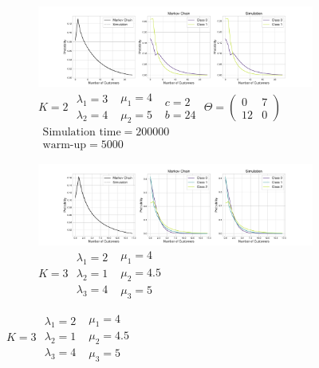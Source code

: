 \documentclass{article}
\begin{document}
\begin{figure}[h!]
  \begin{center}
  \begin{subfigure}[b]{\textwidth}
    \includegraphics[width=\textwidth]{img/appendix_2class.pdf}
    \caption{
        $K = 2$
        $\begin{array}{c}\lambda_1 = 3\\\lambda_2 = 4\end{array}$
        $\begin{array}{c}\mu_1 = 4\\\mu_2 = 5\end{array}$
        $\begin{array}{c}c=2\\b=24\end{array}$
        $\Theta = \begin{pmatrix}0 & 7\\12 & 0\end{pmatrix}$
        $\begin{array}{c}\text{Simulation time} = 200000\\\text{warm-up} = 5000\end{array}$
    }
  \end{subfigure}
  \vspace{3mm}
  \begin{subfigure}[b]{\textwidth}
    \includegraphics[width=\textwidth]{img/appendix_3class.pdf}
    \caption{
        $K = 3$
        $\begin{array}{c}\lambda_1 = 2\\\lambda_2 = 1\\\lambda_3 = 4\end{array}$
        $\begin{array}{c}\mu_1 = 4\\\mu_2 = 4.5\\\mu_3 = 5\end{array}$
}
\end{subfigure}
\end{center}
\end{figure}
\end{document}
